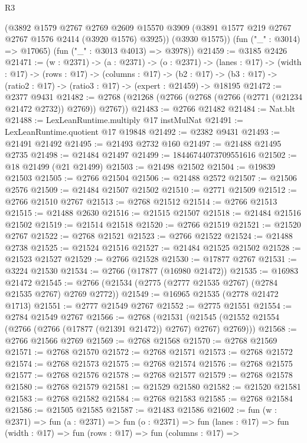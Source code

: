 \begin{lexlean}{R3}
\begin{coremodule}
        (@3892
          @1579
          @2767
          @2769
          @2609
          @15570
          @3909
          (@3891 @1577 @219 @2767 @2767 @1576 @2414 (@3920 @1576) @3925))
        (@3930 @1575))
      (fun ("_" : @3014) => @17065)
      (fun ("_" : @3013 @4013) => @3978))
@21459 := @3185 @2426
@21471 := (w : @2371) ->
  (a : @2371) ->
  (o : @2371) ->
  (lanes : @17) ->
  (width : @17) ->
  (rows : @17) ->
  (columns : @17) ->
  (b2 : @17) -> (b3 : @17) -> (ratio2 : @17) -> (ratio3 : @17) -> (expert : @21459) -> @18195
@21472 := @2377 @9431
@21482 := @2768 (@21268 (@2766 (@2768 (@2766 (@2771 (@21234 @21472 @2732)) @2769)) @2767))
@21483 := @2766 @21482
@21484 := Nat.blt
@21488 := LexLeanRuntime.multiply @17 instMulNat
@21491 := LexLeanRuntime.quotient @17 @19848
@21492 := @2382 @9431
@21493 := @21491 @21492
@21495 := @21493 @2732 @160
@21497 := @21488 @21495 @2735
@21498 := @21484 @21497
@21499 := 18446744073709551616
@21502 := @18 @21499 (@21 @21499)
@21503 := @21498 @21502
@21504 := @19839 @21503
@21505 := @2766 @21504
@21506 := @21488 @2572
@21507 := @21506 @2576
@21509 := @21484 @21507 @21502
@21510 := @2771 @21509
@21512 := @2766 @21510 @2767
@21513 := @2768 @21512
@21514 := @2766 @21513
@21515 := @21488 @2630
@21516 := @21515 @21507
@21518 := @21484 @21516 @21502
@21519 := @21514 @21518
@21520 := @2766 @21519
@21521 := @21520 @2767
@21522 := @2768 @21521
@21523 := @2766 @21522
@21524 := @21488 @2738
@21525 := @21524 @21516
@21527 := @21484 @21525 @21502
@21528 := @21523 @21527
@21529 := @2766 @21528
@21530 := @17877 @2767
@21531 := @3224 @21530
@21534 := @2766 (@17877 (@16980 @21472))
@21535 := @16983 @21472
@21545 := @2766 (@21534 (@2775 (@2777 @21535 @2767) (@2784 @21535 @2767) @2769 @2772))
@21549 := @16965 @21535 (@2778 @21472 @1713)
@21551 := @2777 @21549 @2767
@21552 := @2775 @21551
@21554 := @2784 @21549 @2767
@21566 := @2768
    (@21531 (@21545 (@21552 @21554 (@2766 (@2766 (@17877 (@21391 @21472)) @2767) @2767) @2769)))
@21568 := @2766 @21566 @2769
@21569 := @2768 @21568
@21570 := @2768 @21569
@21571 := @2768 @21570
@21572 := @2768 @21571
@21573 := @2768 @21572
@21574 := @2768 @21573
@21575 := @2768 @21574
@21576 := @2768 @21575
@21577 := @2768 @21576
@21578 := @2768 @21577
@21579 := @2768 @21578
@21580 := @2768 @21579
@21581 := @21529 @21580
@21582 := @21520 @21581
@21583 := @2768 @21582
@21584 := @2768 @21583
@21585 := @2768 @21584
@21586 := @21505 @21585
@21587 := @21483 @21586
@21602 := fun (w : @2371) =>
  fun (a : @2371) =>
  fun (o : @2371) =>
  fun (lanes : @17) =>
  fun (width : @17) =>
  fun (rows : @17) =>
  fun (columns : @17) =>

\end{coremodule}
\end{lexlean}

